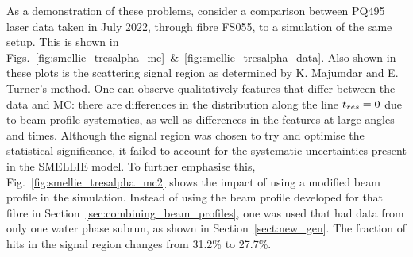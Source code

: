 As a demonstration of these problems, consider a comparison between PQ495 laser data taken in July 2022, through fibre FS055, to a simulation of the same setup. This is shown in Figs.~\ref{fig:smellie_tresalpha_mc}~\&~\ref{fig:smellie_tresalpha_data}. Also shown in these plots is the scattering signal region as determined by K. Majumdar and E. Turner's method. One can observe qualitatively features that differ between the data and MC: there are differences in the distribution along the line $t_{res}{} = 0$ due to beam profile systematics, as well as differences in the features at large angles and times. Although the signal region was chosen to try and optimise the statistical significance, it failed to account for the systematic uncertainties present in the SMELLIE model. To further emphasise this, Fig.~\ref{fig:smellie_tresalpha_mc2} shows the impact of using a modified beam profile in the simulation. Instead of using the beam profile developed for that fibre in Section~\ref{sec:combining_beam_profiles}, one was used that had data from only one water phase subrun, as shown in Section~\ref{sect:new_gen}. The fraction of hits in the signal region changes from 31.2\% to 27.7\%.

